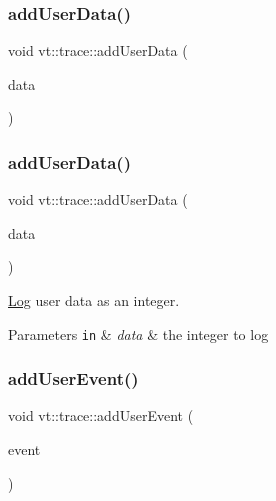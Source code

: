 \subsubsection{\texorpdfstring{add\+User\+Data()}{addUserData()}\hspace{0.1cm}{\footnotesize\ttfamily [1/2]}}
{\footnotesize\ttfamily void vt\+::trace\+::add\+User\+Data (\begin{DoxyParamCaption}\item[{\mbox{[}\mbox{[}maybe\+\_\+unused\mbox{]} \mbox{]} int32\+\_\+t}]{data }\end{DoxyParamCaption})}

\mbox{\label{namespacevt_1_1trace_a0ec1ac44fb179f29245a36b887f588f1}} 
\subsubsection{\texorpdfstring{add\+User\+Data()}{addUserData()}\hspace{0.1cm}{\footnotesize\ttfamily [2/2]}}
{\footnotesize\ttfamily void vt\+::trace\+::add\+User\+Data (\begin{DoxyParamCaption}\item[{int32\+\_\+t}]{data }\end{DoxyParamCaption})}



\hyperlink{structvt_1_1trace_1_1_log}{Log} user data as an integer. 


\begin{DoxyParams}[1]{Parameters}
\mbox{\tt in}  & {\em data} & the integer to log \\
\hline
\end{DoxyParams}
\mbox{\label{namespacevt_1_1trace_a780c57bc3a00801318ce086479b05251}} 
\subsubsection{\texorpdfstring{add\+User\+Event()}{addUserEvent()}\hspace{0.1cm}{\footnotesize\ttfamily [1/2]}}
{\footnotesize\ttfamily void vt\+::trace\+::add\+User\+Event (\begin{DoxyParamCaption}\item[{\mbox{[}\mbox{[}maybe\+\_\+unused\mbox{]} \mbox{]} \hyperlink{namespacevt_1_1trace_a5908920d051c144c89f17c69ed262350}{User\+Event\+I\+D\+Type}}]{event }\end{DoxyParamCaption})}

